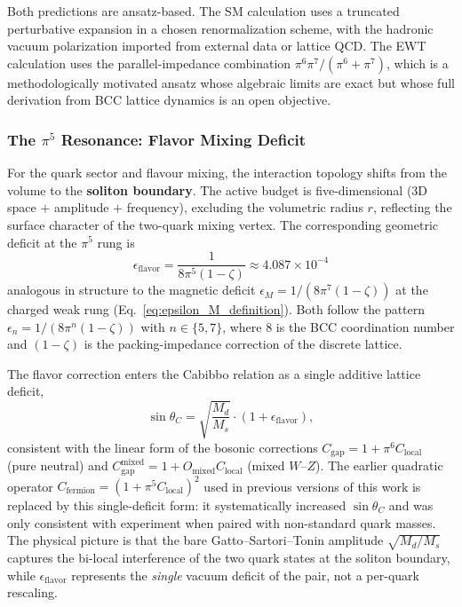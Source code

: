 \documentclass[10pt,a4paper]{article}
\begin{document}
Both predictions are ansatz-based. The SM calculation uses a
truncated perturbative expansion in a chosen renormalization scheme,
with the hadronic vacuum polarization imported from external data or
lattice QCD. The EWT calculation uses the parallel-impedance
combination $\pi^6\pi^7/(\pi^6+\pi^7)$, which is a methodologically
motivated ansatz whose algebraic limits are exact but whose full
derivation from BCC lattice dynamics is an open objective.


\subsubsection{The $\pi^5$ Resonance: Flavor Mixing Deficit}
\label{sec:pi5_flavor}

For the quark sector and flavour mixing, the interaction topology
shifts from the volume to the \textbf{soliton boundary}. The active
budget is five-dimensional (3D space $+$ amplitude $+$ frequency),
excluding the volumetric radius $r$, reflecting the surface character
of the two-quark mixing vertex. The corresponding geometric deficit
at the $\pi^5$ rung is
\begin{equation}
	\boxed{
		\epsilon_{\text{flavor}}
		= \frac{1}{8\pi^5(1-\zeta)}
		\approx 4.087 \times 10^{-4}
	}
	\label{eq:eps_flavor_pi5}
\end{equation}
analogous in structure to the magnetic deficit
$\epsilon_M = 1/(8\pi^7(1-\zeta))$ at the charged weak rung
(Eq.~\ref{eq:epsilon_M_definition}). Both follow the pattern
$\epsilon_n = 1/(8\pi^n(1-\zeta))$ with $n \in \{5, 7\}$,
where $8$ is the BCC coordination number and $(1-\zeta)$ is the
packing-impedance correction of the discrete lattice.

The flavor correction enters the Cabibbo relation as a single
additive lattice deficit,
\begin{equation}
	\sin\theta_C = \sqrt{\frac{M_d}{M_s}}
	\cdot \left(1 + \epsilon_{\text{flavor}}\right),
	\label{eq:cabibbo_pi5}
\end{equation}
consistent with the linear form of the bosonic corrections
$C_{\text{gap}} = 1 + \pi^6 C_{\text{local}}$ (pure neutral) and
$C_{\text{gap}}^{\text{mixed}} = 1 + O_{\text{mixed}} C_{\text{local}}$
(mixed $W$--$Z$). The earlier quadratic operator
$C_{\text{fermion}} = (1+\pi^5 C_{\text{local}})^2$ used in previous
versions of this work is replaced by this single-deficit form: it
systematically increased $\sin\theta_C$ and was only consistent with
experiment when paired with non-standard quark masses. The physical
picture is that the bare Gatto--Sartori--Tonin amplitude
$\sqrt{M_d/M_s}$ captures the bi-local interference of the two quark
states at the soliton boundary, while $\epsilon_{\text{flavor}}$
represents the \emph{single} vacuum deficit of the pair, not a
per-quark rescaling.
\end{document}
